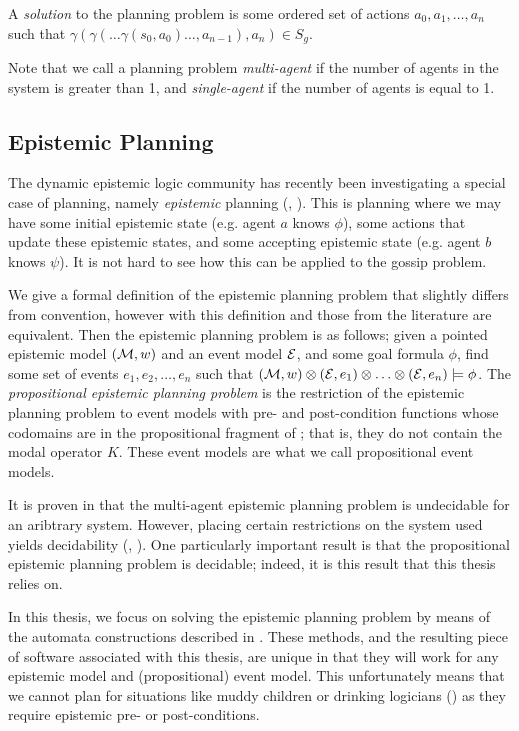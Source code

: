 \documentclass[10pt, a4paper]{report}
\begin{document}
A \emph{solution} to the planning problem is some ordered set of actions
${a_0, a_1, \ldots, a_n}$ such that $\gamma(\gamma(\ldots \gamma(s_0, a_0)
\ldots ,a_{n-1}) ,a_n) \in S_g$. 

Note that we call a planning problem \emph{multi-agent} if the number of
agents in the system is greater than 1, and \emph{single-agent} if the number
of agents is equal to 1. 

\subsection{Epistemic Planning}

The dynamic epistemic logic community has recently been investigating a special case
of planning, namely \emph{epistemic} planning (\cite{BolanderEP},
\cite{UndecidabilityEP}). This is planning where we may have some initial
epistemic state (e.g. agent $a$ knows $\phi$), some actions that update these
epistemic states, and some accepting epistemic state (e.g. agent $b$ knows
$\psi$). It is not hard to see how this can be applied to the gossip problem.

We give a formal definition of the epistemic planning problem that slightly
differs from convention, however with this definition and those from the
literature are equivalent. Then the epistemic planning problem is as follows;
given a pointed epistemic model $(\mathcal{M}, w)$ and an event model $\mathcal{E}$, and
some goal formula $\phi$, find some set of events ${e_1, e_2, \ldots, e_n}$ such
that $(\mathcal{M}, w) \otimes (\mathcal{E}, e_1) \otimes \ldots \otimes (\mathcal{E}, e_n)
\models \phi$. The \emph{propositional epistemic planning problem} is the
restriction of the epistemic planning problem to event models with pre- and
post-condition functions whose codomains are in the propositional fragment of
; that is, they do not contain the modal operator $K$. These event models
are what we call propositional event models.

It is proven in \cite{BolanderEP} that the multi-agent epistemic planning
problem is undecidable for an aribtrary system. However, placing certain
restrictions on the system used yields decidability (\cite{DecidabilityEp},
\cite{AutomataTechniques}). One particularly important result is that the
propositional epistemic planning problem is decidable; indeed, it is this result
that this thesis relies on. 


In this thesis, we focus on solving the epistemic planning problem by means of
the automata constructions described in \cite{AutomataTechniques}. These
methods, and the resulting piece of software associated with this thesis, are
unique in that they will work for any epistemic model and (propositional) event
model. This unfortunately means that we cannot plan for situations like muddy
children or drinking logicians (\cite{DEMO-S5}) as they require epistemic pre-
or post-conditions. 
\end{document}
